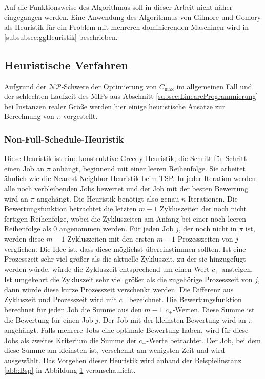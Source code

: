 \documentclass{scrreprt}
\begin{document}
Auf die Funktionsweise des Algorithmus soll in dieser Arbeit nicht näher eingegangen werden.
Eine Anwendung des Algorithmus von Gilmore und Gomory als Heuristik für ein Problem mit mehreren dominierenden Maschinen wird in
\ref{subsubsec:ggHeuristik} beschrieben.


\subsection{Heuristische Verfahren}
\label{subsec:HeuristischeVerfahren}
Aufgrund der $\mathcal{NP}$-Schwere der Optimierung von $C_{\max}$ im allgemeinen Fall und der schlechten Laufzeit des MIPs aus Abschnitt \ref{subsec:LineareProgrammierung}
bei Instanzen realer Größe werden hier einige heuristische Ansätze zur Berechnung von $\pi$ vorgestellt.

\subsubsection{Non-Full-Schedule-Heuristik}
Diese Heuristik ist eine konstruktive Greedy-Heuristik, die Schritt für Schritt einen Job an $\pi$ anhängt, beginnend mit einer leeren Reihenfolge.
Sie arbeitet ähnlich wie die Nearest-Neighbor-Heuristik beim TSP.
In jeder Iteration werden alle noch verbleibenden Jobs bewertet und der Job mit der besten Bewertung wird an $\pi$ angehängt.
Die Heuristik benötigt also genau $n$ Iterationen.
Die Bewertungsfunktion betrachtet die letzten $m-1$ Zykluszeiten der noch nicht fertigen Reihenfolge, 
wobei die Zykluszeiten am Anfang bei einer noch leeren Reihenfolge als $0$ angenommen werden.
Für jeden Job $j$, der noch nicht in $\pi$ ist, werden diese $m-1$ Zykluszeiten mit den ersten $m-1$ Prozesszeiten von $j$ verglichen.
Die Idee ist, dass diese möglichst übereinstimmen sollten. Ist eine Prozesszeit sehr viel größer als die aktuelle Zykluszeit,
zu der sie hinzugefügt werden würde, würde die Zykluszeit entsprechend um einen Wert $c_+$ ansteigen.
Ist umgekehrt die Zykluszeit sehr viel größer als die zugehörige Prozesszeit von $j$, dann würde diese kurze Prozesszeit verschenkt werden.
Die Differenz aus Zykluszeit und Prozesszeit wird mit $c_-$ bezeichnet.
Die Bewertungsfunktion berechnet für jeden Job die Summe aus den $m-1$ $c_+$-Werten.
Diese Summe ist die Bewertung für einen Job $j$. Der Job mit der kleinsten Bewertung wird an $\pi$ angehängt.
Falls mehrere Jobs eine optimale Bewertung haben, wird für diese Jobs als zweites Kriterium die Summe der $c_-$-Werte betrachtet.
Der Job, bei dem diese Summe am kleinsten ist, verschenkt am wenigsten Zeit und wird ausgewählt.
Das Vorgehen dieser Heuristik wird anhand der Beispielinstanz \ref{abb:Bsp} in Abbildung \ref{abb:nfsbsp} veranschaulicht.
\begin{figure}
    \begin{center}
    \end{center}
    \caption{
        \label{abb:nfsbsp}
    }
\end{figure}
\end{document}
